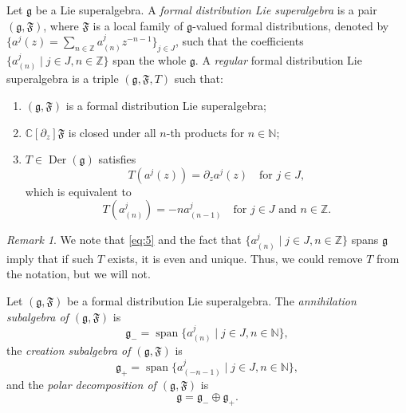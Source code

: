 \documentclass[a4paper, 12pt, reqno]{amsart}
\theoremstyle{remark}
\newtheorem{remark}[theorem]{Remark}
\DeclareMathOperator{\vspan}{span}
\DeclareMathOperator{\Der}{Der}
\begin{document}
Let $\mathfrak{g}$ be a Lie superalgebra.
A \emph{formal distribution Lie superalgebra} is a pair $(\mathfrak{g}, \mathfrak{F})$, where $\mathfrak{F}$ is a local family of $\mathfrak{g}$-valued formal distributions, denoted by $\{a^j(z) = \sum_{n \in \mathbb{Z}}a^j_{(n)}z^{-n - 1}\}_{j \in J}$, such that the coefficients $\{a^j_{(n)} \mid j \in J, n \in \mathbb{Z}\}$ span the whole $\mathfrak{g}$.
A \emph{regular} formal distribution Lie superalgebra is a triple $(\mathfrak{g}, \mathfrak{F}, T)$ such that:
\begin{enumerate}
\item $(\mathfrak{g}, \mathfrak{F})$ is a formal distribution Lie superalgebra;
\item $\mathbb{C}[\partial_z]\mathfrak{F}$ is closed under all $n$-th products for $n \in \mathbb{N}$;
\item $T \in \Der(\mathfrak{g})$ satisfies
  \begin{equation*}
    T(a^j(z)) = \partial_za^j(z) \quad \text{for $j \in J$},
  \end{equation*}
  which is equivalent to
  \begin{equation}
    \label{eq:5}
    T(a^j_{(n)}) = -na^j_{(n - 1)} \quad \text{for $j \in J$ and $n \in \mathbb{Z}$}.
  \end{equation}
\end{enumerate}

\begin{remark}
  \label{rmk:6}
  We note that \eqref{eq:5} and the fact that $\{a^j_{(n)} \mid j \in J, n \in \mathbb{Z}\}$ spans $\mathfrak{g}$ imply that if such $T$ exists, it is even and unique.
  Thus, we could remove $T$ from the notation, but we will not.
\end{remark}

Let $(\mathfrak{g}, \mathfrak{F})$ be a formal distribution Lie superalgebra.
The \emph{annihilation subalgebra of $(\mathfrak{g}, \mathfrak{F})$} is
\begin{equation*}
  \mathfrak{g}_- = \vspan\{a^j_{(n)} \mid j \in J, n \in \mathbb{N}\},
\end{equation*}
the \emph{creation subalgebra of $(\mathfrak{g}, \mathfrak{F})$} is
\begin{equation*}
  \mathfrak{g}_+ = \vspan\{a^j_{(-n - 1)} \mid j \in J, n \in \mathbb{N}\},
\end{equation*}
and the \emph{polar decomposition of $(\mathfrak{g}, \mathfrak{F})$} is
\begin{equation*}
  \mathfrak{g} = \mathfrak{g}_- \oplus \mathfrak{g}_+.
\end{equation*}
\end{document}
